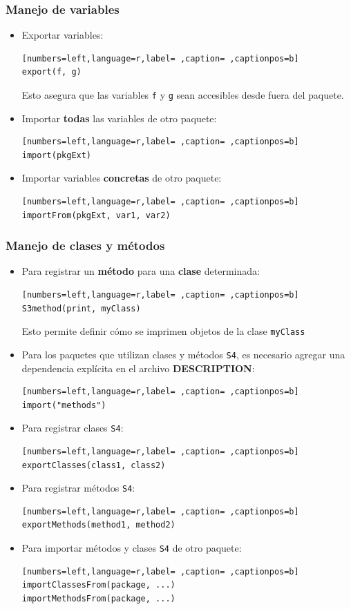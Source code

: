 \subsubsection{Manejo de variables}
\label{sec:org8f98ed2}
\begin{itemize}
\item Exportar variables:
\begin{lstlisting}[numbers=left,language=r,label= ,caption= ,captionpos=b]
export(f, g)
\end{lstlisting}
Esto asegura que las variables \texttt{f} y \texttt{g} sean accesibles desde fuera del paquete.
\item Importar \textbf{todas} las variables de otro paquete:
\begin{lstlisting}[numbers=left,language=r,label= ,caption= ,captionpos=b]
import(pkgExt)
\end{lstlisting}
\item Importar variables \textbf{concretas} de otro paquete:
\begin{lstlisting}[numbers=left,language=r,label= ,caption= ,captionpos=b]
importFrom(pkgExt, var1, var2)
\end{lstlisting}
\end{itemize}
\subsubsection{Manejo de clases y métodos}
\label{sec:orge592cf5}
\begin{itemize}
\item Para registrar un \textbf{método} para una \textbf{clase} determinada:
\begin{lstlisting}[numbers=left,language=r,label= ,caption= ,captionpos=b]
S3method(print, myClass)
\end{lstlisting}
Esto permite definir cómo se imprimen objetos de la clase \texttt{myClass}
\item Para los paquetes que utilizan clases y métodos \texttt{S4}, es necesario agregar una dependencia explícita en el archivo \textbf{DESCRIPTION}:
\begin{lstlisting}[numbers=left,language=r,label= ,caption= ,captionpos=b]
import("methods")
\end{lstlisting}
\item Para registrar clases \texttt{S4}:
\begin{lstlisting}[numbers=left,language=r,label= ,caption= ,captionpos=b]
exportClasses(class1, class2)
\end{lstlisting}
\item Para registrar métodos \texttt{S4}:
\begin{lstlisting}[numbers=left,language=r,label= ,caption= ,captionpos=b]
exportMethods(method1, method2)
\end{lstlisting}
\item Para importar métodos y clases \texttt{S4} de otro paquete:
\begin{lstlisting}[numbers=left,language=r,label= ,caption= ,captionpos=b]
importClassesFrom(package, ...)
importMethodsFrom(package, ...)
\end{lstlisting}
\end{itemize}
